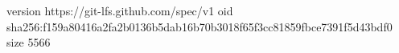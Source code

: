 version https://git-lfs.github.com/spec/v1
oid sha256:f159a80416a2fa2b0136b5dab16b70b3018f65f3cc81859fbce7391f5d43bdf0
size 5566
